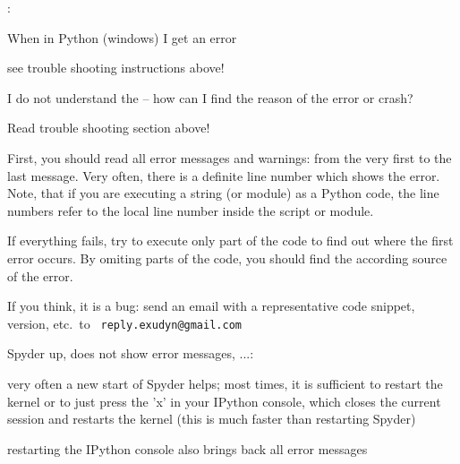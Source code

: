 \ei
\ei \vspace{12pt}
:
\bn
\item When  \codeName in Python (windows) I get an error 
\bi
\item[$\ra$] see trouble shooting instructions above!
\ei
\item I do not understand the  -- how can I find the reason of the error or crash?
\bi
\item[$\ra$] Read trouble shooting section above! 
\item[$\ra$] First, you should read all error messages and warnings: from the very first to the last message. Very often, there is a definite line number which shows the error. Note, that if you are executing a string (or module) as a Python code, the line numbers refer to the local line number inside the script or module.
\item[$\ra$] If everything fails, try to execute only part of the code to find out where the first error occurs. By omiting parts of the code, you should find the according source of the error.
\item[$\ra$] If you think, it is a bug: send an email with a representative code snippet, version, etc.\ to \texttt{ reply.exudyn@gmail.com}
\ei
\item Spyder  up, does not show error messages, ...:
\bi
\item[$\ra$] very often a new start of Spyder helps; most times, it is sufficient to restart the kernel or to just press the 'x' in your IPython console, which closes the current session and restarts the kernel (this is much faster than restarting Spyder)
\item[$\ra$] restarting the IPython console also brings back all error messages
\ei
